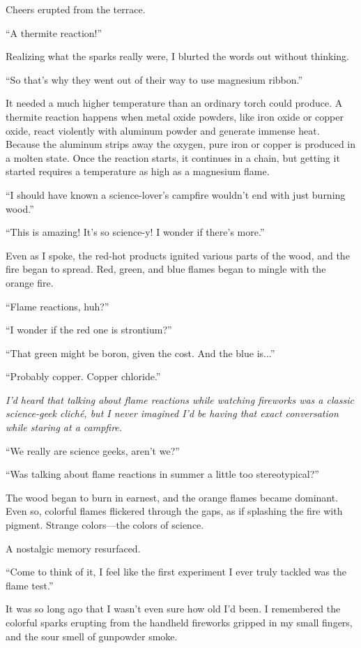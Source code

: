 \documentclass[
    a4paper,
    12pt,
    twoside,
    openany,
    UTF8,
    fontset=windows
]{ctexbook}
\begin{document}
Cheers erupted from the terrace.

``A thermite reaction!''

Realizing what the sparks really were, I blurted the words out without thinking.

``So that's why they went out of their way to use magnesium ribbon.''

It needed a much higher temperature than an ordinary torch could produce. A thermite reaction happens when metal oxide powders, like iron oxide or copper oxide, react violently with aluminum powder and generate immense heat. Because the aluminum strips away the oxygen, pure iron or copper is produced in a molten state. Once the reaction starts, it continues in a chain, but getting it started requires a temperature as high as a magnesium flame.

``I should have known a science-lover's campfire wouldn't end with just burning wood.''

``This is amazing! It's so science-y! I wonder if there's more.''

Even as I spoke, the red-hot products ignited various parts of the wood, and the fire began to spread. Red, green, and blue flames began to mingle with the orange fire.

``Flame reactions, huh?''

``I wonder if the red one is strontium?''

``That green might be boron, given the cost. And the blue is...''

``Probably copper. Copper chloride.''

\textit{I'd heard that talking about flame reactions while watching fireworks was a classic science-geek cliché, but I never imagined I'd be having that exact conversation while staring at a campfire.}

``We really are science geeks, aren't we?''

``Was talking about flame reactions in summer a little too stereotypical?''

The wood began to burn in earnest, and the orange flames became dominant. Even so, colorful flames flickered through the gaps, as if splashing the fire with pigment. Strange colors---the colors of science.

A nostalgic memory resurfaced.

``Come to think of it, I feel like the first experiment I ever truly tackled was the flame test.''

It was so long ago that I wasn't even sure how old I'd been. I remembered the colorful sparks erupting from the handheld fireworks gripped in my small fingers, and the sour smell of gunpowder smoke.
\end{document}

